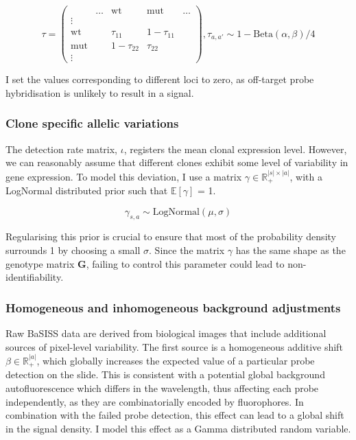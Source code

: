 \begin{equation}
 {\tau} = \left(\begin{array}{c|cccc}
       & \ldots & \text{wt} & \text{mut} & \ldots \\ 
\hline
 \vdots &  &        &        & \\
\text{wt}      &  & \tau_{11} & 1-\tau_{11} &  \\
\text{mut}     &  & 1-\tau_{22} & \tau_{22} &  \\
\vdots  &  &        &        & 
\end{array}\right), {\tau}_{a,a'} \sim 1-\text{Beta}(\alpha, \beta)/4
\end{equation}

I set the values corresponding to different loci to zero, as off-target probe hybridisation is unlikely to result in a signal.

\subsubsection*{Clone specific allelic variations}

The detection rate matrix, $\iota$, registers the mean clonal expression level. However, we can reasonably assume that different clones exhibit some level of variability in gene expression. To model this deviation, I use a matrix $\gamma \in \mathbb{R}_{+}^{|s|\times|a|}$, with a LogNormal distributed prior such that $\mathbb{E}[\gamma]$ = 1.

\begin{equation} 
\gamma_{s,a} \sim \text{LogNormal}(\mu, \sigma)
\end{equation}

Regularising this prior is crucial to ensure that most of the probability density surrounds 1 by choosing a small $\sigma$. Since the matrix $\gamma$ has the same shape as the genotype matrix $\mathbf{G}$, failing to control this parameter could lead to non-identifiability.

\subsubsection*{Homogeneous and inhomogeneous background adjustments}
\label{sec:background_adjustment}
Raw \ac{BaSISS} data are derived from biological images that include additional sources of pixel-level variability. The first source is a homogeneous additive shift $\beta \in \mathbb{R}_{+}^{|a|}$, which globally increases the expected value of a particular probe detection on the slide. This is consistent with a potential global background autofluorescence which differs in the wavelength, thus affecting each probe independently, as they are combinatorially encoded by fluorophores. In combination with the failed probe detection, this effect can lead to a global shift in the signal density. I model this effect as a Gamma distributed random variable.

